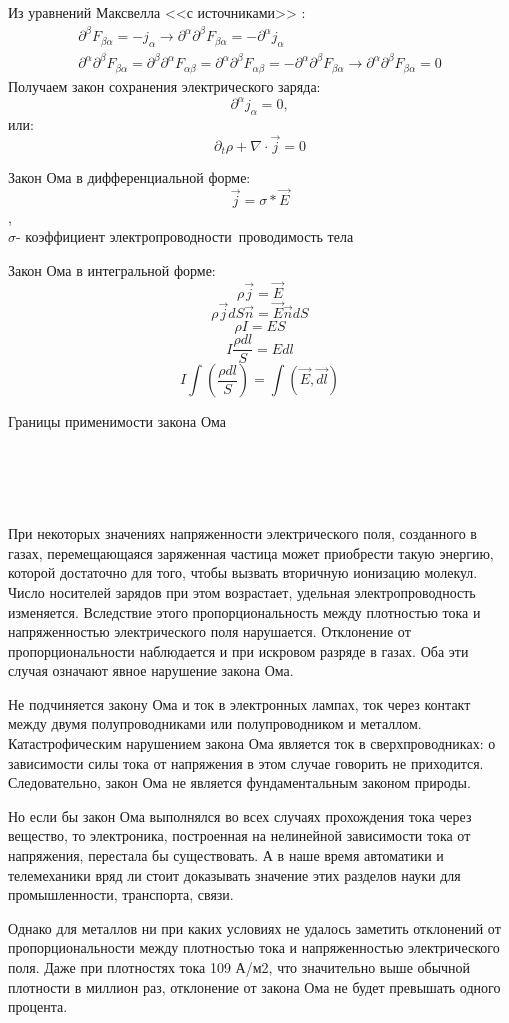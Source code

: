 \documentclass[__main__.tex]{subfiles}
\begin{document}
Из уравнений Максвелла <<с источниками>> :
\begin{gather*}
	\partial^\beta F_{\beta\alpha} = -j_\alpha \longrightarrow \partial^\alpha\partial^\beta F_{\beta\alpha} = -\partial^\alpha j_\alpha\\
	\partial^\alpha\partial^\beta F_{\beta\alpha} = \partial^\beta\partial^\alpha F_{\alpha\beta} = \partial^\alpha\partial^\beta F_{\alpha\beta} = - \partial^\alpha\partial^\beta F_{\beta\alpha} \longrightarrow \partial^\alpha\partial^\beta F_{\beta\alpha} = 0
\end{gather*}
Получаем закон сохранения электрического заряда:
$$\partial^\alpha j_\alpha = 0,$$
или:
$$\partial_t\rho + \nabla \cdot \vec j = 0$$

\begin{definition}
	Закон Ома в дифференциальной форме:
	$$\vec{j}=σ*\vec{E}$$,
	\\$σ$- коэффициент электропроводности\ проводимость тела
\end{definition}
\begin{definition}
	Закон Ома в интегральной форме:
	$$ρ\vec{j}=\vec{E}$$
	$$ρ\vec{j}dS\vec{n}=\vec{E}\vec{n}dS$$
	$$ρI=ES$$
	$$I\frac{ρdl}{S}=Edl$$
	$$I\int(\frac{ρdl}{S})=\int(\vec{E},\vec{dl})$$
\end{definition}
Границы применимости закона Ома\\\\\


\\\\При некоторых значениях напряженности электрического поля, созданного в газах, перемещающаяся заряженная частица может приобрести такую энергию, которой достаточно для того, чтобы вызвать вторичную ионизацию молекул. Число носителей зарядов при этом возрастает, удельная электропроводность изменяется. Вследствие этого пропорциональность между плотностью тока и напряженностью электрического поля нарушается. Отклонение от пропорциональности наблюдается и при искровом разряде в газах. Оба эти случая означают явное нарушение закона Ома.

Не подчиняется закону Ома и ток в электронных лампах, ток через контакт между двумя полупроводниками или полупроводником и металлом. Катастрофическим нарушением закона Ома является ток в сверхпроводниках: о зависимости силы тока от напряжения в этом случае говорить не приходится. Следовательно, закон Ома не является фундаментальным законом природы.

Но если бы закон Ома выполнялся во всех случаях прохождения тока через вещество, то электроника, построенная на нелинейной зависимости тока от напряжения, перестала бы существовать. А в наше время автоматики и телемеханики вряд ли стоит доказывать значение этих разделов науки для промышленности, транспорта, связи.

Однако для металлов ни при каких условиях не удалось заметить отклонений от пропорциональности между плотностью тока и напряженностью электрического поля. Даже при плотностях тока 109 А/м2, что значительно выше обычной плотности в миллион раз, отклонение от закона Ома не будет превышать одного процента.
\end{document}
